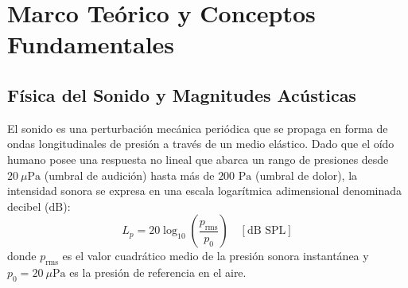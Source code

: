 \documentclass{article}
\begin{document}
\section{Marco Teórico y Conceptos Fundamentales}

\subsection{Física del Sonido y Magnitudes Acústicas}
El sonido es una perturbación mecánica periódica que se propaga en forma de ondas longitudinales de presión a través de un medio elástico. Dado que el oído humano posee una respuesta no lineal que abarca un rango de presiones desde $20\ \mu\text{Pa}$ (umbral de audición) hasta más de $200\text{ Pa}$ (umbral de dolor), la intensidad sonora se expresa en una escala logarítmica adimensional denominada decibel ($\text{dB}$):
\begin{equation}
    L_p = 20 \log_{10} \left( \frac{p_{\text{rms}}}{p_0} \right) \quad [\text{dB SPL}]
\end{equation}
donde $p_{\text{rms}}$ es el valor cuadrático medio de la presión sonora instantánea y $p_0 = 20\ \mu\text{Pa}$ es la presión de referencia en el aire.
\end{document}
